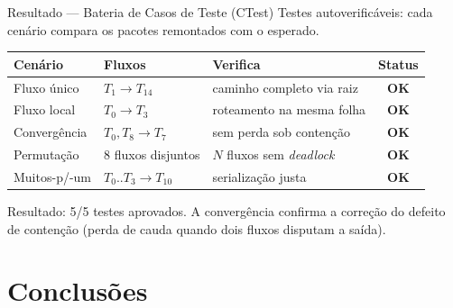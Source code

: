 \documentclass[aspectratio=169]{beamer}
\begin{document}
\begin{frame}{Resultado --- Bateria de Casos de Teste (CTest)}
  \centering
  Testes autoverificáveis: cada cenário compara os pacotes remontados com o
  esperado.
  \vspace{2mm}

  \renewcommand{\arraystretch}{1.3}
  \footnotesize
  \begin{tabular}{@{}lll c@{}}
    \toprule
    \textbf{Cenário} & \textbf{Fluxos} & \textbf{Verifica} & \textbf{Status} \\
    \midrule
    Fluxo único    & $T_1\!\to\!T_{14}$        & caminho completo via raiz       & \textcolor{green!55!black}{\textbf{OK}} \\
    Fluxo local    & $T_0\!\to\!T_3$           & roteamento na mesma folha       & \textcolor{green!55!black}{\textbf{OK}} \\
    Convergência   & $T_0,T_8\!\to\!T_7$       & sem perda sob contenção         & \textcolor{green!55!black}{\textbf{OK}} \\
    Permutação     & 8 fluxos disjuntos        & $N$ fluxos sem \emph{deadlock}  & \textcolor{green!55!black}{\textbf{OK}} \\
    Muitos-p/-um   & $T_0..T_3\!\to\!T_{10}$   & serialização justa              & \textcolor{green!55!black}{\textbf{OK}} \\
    \bottomrule
  \end{tabular}

  \vfill
  \alert{Resultado: 5/5 testes aprovados.} A convergência confirma a correção do
  defeito de contenção (perda de cauda quando dois fluxos disputam a saída).
\end{frame}

\section{Conclusões}
\end{document}
